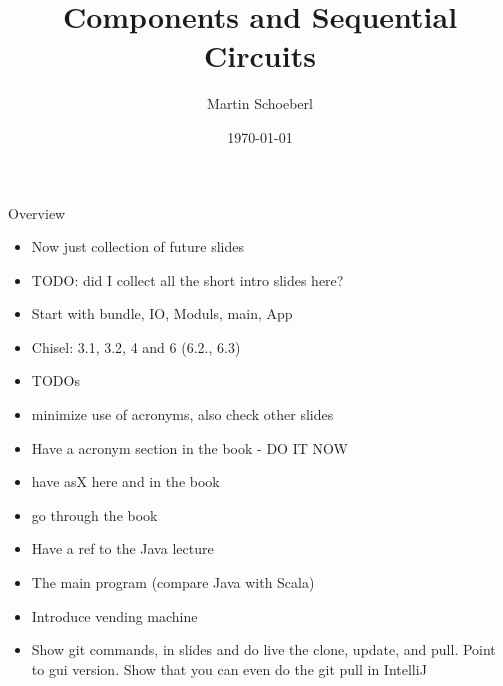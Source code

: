 

\newif\ifbook



\title{Components and Sequential Circuits}
\author{Martin Schoeberl}
\date{\today}



\begin{frame}
\titlepage
\end{frame}


\begin{frame}[fragile]{Overview}
\begin{itemize}
\item Now just  collection of future slides
\item TODO: did I collect all the short intro slides here?
\item Start with bundle, IO, Moduls, main, App
\item Chisel: 3.1, 3.2, 4 and 6 (6.2., 6.3)
\item TODOs
\item minimize use of acronyms, also check other slides
\item Have a acronym section in the book - DO IT NOW
\item have asX here and in the book
\item go through the book
\item Have a ref to the Java lecture
\item The main program (compare Java with Scala)
\item Introduce vending machine
\item Show git commands, in slides and do live the clone, update, and pull. Point to gui version. Show that you can even do the git pull in IntelliJ
\end{itemize}
\end{frame}


